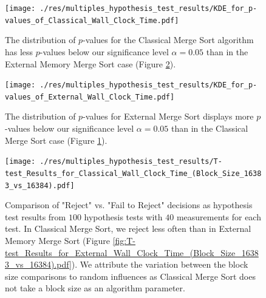 \documentclass[twocolumn]{article}
\begin{document}
\begin{figure}[htb]
    \begin{minipage}{0.475 \textwidth}
        \centering
        \texttt{[image: ./res/multiples\_hypothesis\_test\_results/KDE\_for\_p-values\_of\_Classical\_Wall\_Clock\_Time.pdf]}
        \caption{The distribution of \( p \)-values for the Classical Merge Sort algorithm has less \( p \)-values below our significance level \( \alpha = 0.05 \) than in the External Memory Merge Sort case (Figure \ref{fig:KDE_for_p-values_of_External_Wall_Clock_Time.pdf}).}
        \label{fig:KDE_for_p-values_of_Classical_Wall_Clock_Time.pdf}
    \end{minipage}
\end{figure}

\begin{figure}[htb]
    \begin{minipage}{0.475 \textwidth}
        \centering
        \texttt{[image: ./res/multiples\_hypothesis\_test\_results/KDE\_for\_p-values\_of\_External\_Wall\_Clock\_Time.pdf]}
        \caption{The distribution of \( p \)-values for External Merge Sort displays more \( p \)-values below our significance level \( \alpha = 0.05 \) than in the Classical Merge Sort case (Figure \ref{fig:KDE_for_p-values_of_Classical_Wall_Clock_Time.pdf}).}
        \label{fig:KDE_for_p-values_of_External_Wall_Clock_Time.pdf}
    \end{minipage}
\end{figure}

\begin{figure}[htb]
    \begin{minipage}{0.475 \textwidth}
        \centering
        \texttt{[image: ./res/multiples\_hypothesis\_test\_results/T-test\_Results\_for\_Classical\_Wall\_Clock\_Time\_(Block\_Size\_16383\_vs\_16384).pdf]}
        \caption{Comparison of "Reject" vs. "Fail to Reject" decisions as hypothesis test results from \( 100 \) hypothesis tests with \( 40 \) measurements for each test.
            In Classical Merge Sort, we reject less often than in External Memory Merge Sort (Figure \ref{fig:T-test_Results_for_External_Wall_Clock_Time_(Block_Size_16383_vs_16384).pdf}).
            We attribute the variation between the block size comparisons to random influences as Classical Merge Sort does not take a block size as an algorithm parameter.}
        \label{fig:T-test_Results_for_Classical_Wall_Clock_Time_(Block_Size_16383_vs_16384).pdf}
    \end{minipage}
\end{figure}
\end{document}
